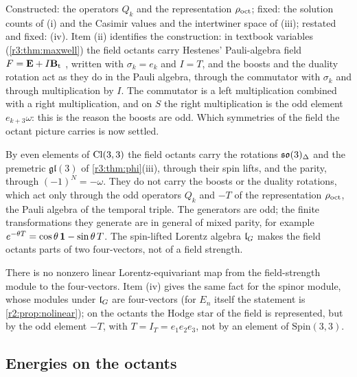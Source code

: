 Constructed: the operators $Q_k$ and the representation $\rho_{\rm oct}$; fixed: the solution counts of (i) and the Casimir values and the
intertwiner space of (iii); restated and fixed: (iv). Item (ii) identifies the construction: in textbook variables (\cref{r3:thm:maxwell}) the
field octants carry Hestenes' Pauli-algebra field $F=\mathbf E+I\mathbf B_{\rm t}$ \cite{Hestenes66}, written with $\sigma_k=e_k$ and $I=T$, and the boosts and the
duality rotation act as they do in the Pauli algebra, through the commutator with $\sigma_k$ and through multiplication by $I$. The
commutator is a left multiplication combined with a right multiplication, and on $S$ the right multiplication is the odd element
$e_{k+3}\omega$: this is the reason the boosts are odd. Which symmetries of the field the octant picture carries is now settled.

\begin{corollary}
\label{r3:cor:carries}
By even elements of $\mathrm{Cl}(3,3)$ the field octants carry the rotations $\mathfrak{so}(3)_\Delta$ and the premetric $\mathfrak{gl}(3)$ of \cref{r3:thm:phi}(iii),
through their spin lifts, and the parity, through $(-1)^N=-\omega$. They do not carry the boosts or the duality
rotations, which act only through the odd operators $Q_k$ and $-T$ of the representation $\rho_{\rm oct}$, the Pauli algebra of the temporal triple.
The generators are odd; the finite transformations they generate are in general of mixed parity, for example
$e^{-\theta T}=\cos\theta\,\mathbf 1-\sin\theta\,T$.
The spin-lifted Lorentz algebra $\mathfrak l_G$ makes the field octants parts of two four-vectors, not of a field strength.
\end{corollary}

There is no nonzero linear Lorentz-equivariant map from the field-strength module to the four-vectors. Item (iv) gives the same fact for the spinor module, whose modules under $\mathfrak l_G$ are four-vectors (for $E_n$ itself
the statement is \cref{r2:prop:nolinear}); on the octants the Hodge star of the field is represented, but by the odd element $-T$, with $T=I_T=e_1e_2e_3$, not by an element of $\mathrm{Spin}(3,3)$.

\subsection{Energies on the octants}
\label{r3:sec:energies}

